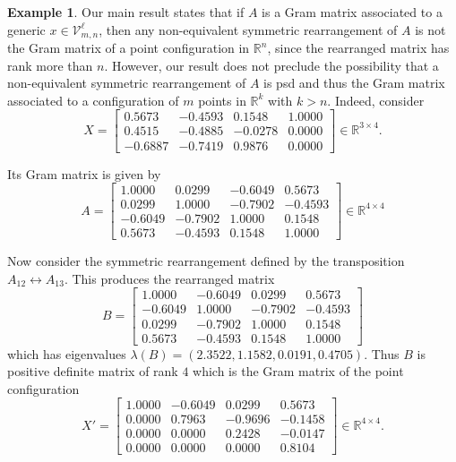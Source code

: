 \documentclass{article}
\theoremstyle{definition}
\newtheorem{Example}{Example}
\renewcommand{\r}{\mathbb{R}}
\renewcommand{\|}{|}
\newcommand{\rank}[1]{\mathrm{rank}\left(#1\right)}
\newcommand{\dan}[1]{{\color{red} [[Dan: #1]]}}
\begin{document}
\begin{Example}
Our main result states that if $A$ is a Gram matrix associated to a generic 
$x \in \mathcal{V}_{m,n}^{\ell}$, then any non-equivalent symmetric rearrangement of $A$ is not the Gram matrix of a point configuration in $\r^{n}$, since the rearranged matrix has rank more than $n$. However, our result does not preclude the possibility that a non-equivalent symmetric rearrangement of $A$ is psd and thus the Gram matrix associated to a
configuration of $m$ points in $\r^{k}$ with $k > n$.
Indeed, consider
$$
X =
\begin{bmatrix}
 0.5673 & -0.4593 &  0.1548 &  1.0000 \\
 0.4515 & -0.4885 & -0.0278 &  0.0000 \\
-0.6887 & -0.7419 &  0.9876 &  0.0000
\end{bmatrix}
\in \mathbb{R}^{3\times 4}.
$$

Its Gram matrix is given by
$$
A = \begin{bmatrix}
 1.0000 &  0.0299 & -0.6049 &  0.5673 \\
 0.0299 &  1.0000 & -0.7902 & -0.4593 \\
-0.6049 & -0.7902 &  1.0000 &  0.1548 \\
 0.5673 & -0.4593 &  0.1548 &  1.0000
\end{bmatrix} \in \r^{4\times 4}
$$

Now consider the symmetric rearrangement defined by the transposition $A_{12} \leftrightarrow A_{13}$. This produces the rearranged matrix
$$
B =
\begin{bmatrix}
 1.0000 & -0.6049 &  0.0299 &  0.5673 \\
-0.6049 &  1.0000 & -0.7902 & -0.4593 \\
 0.0299 & -0.7902 &  1.0000 &  0.1548 \\
 0.5673 & -0.4593 &  0.1548 &  1.0000
\end{bmatrix}
$$
which has eigenvalues 
$\lambda(B) = (
2.3522, 1.1582, 0.0191, 0.4705)$. Thus $B$ is positive definite
matrix of rank $4$ which is the Gram matrix of the point configuration
$$X' = \begin{bmatrix}
1.0000 & -0.6049 &  0.0299 &  0.5673 \\
0.0000 &  0.7963 & -0.9696 & -0.1458 \\
0.0000 &  0.0000 &  0.2428 & -0.0147 \\
0.0000 &  0.0000 &  0.0000 &  0.8104
\end{bmatrix} \in \mathbb{R}^{4\times 4}.$$


\end{Example}
\end{document}
